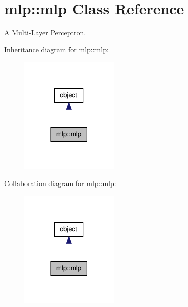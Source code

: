 \hypertarget{classmlp_1_1mlp}{
\section{mlp::mlp Class Reference}
\label{classmlp_1_1mlp}
}


A Multi-\/Layer Perceptron.  




Inheritance diagram for mlp::mlp:\nopagebreak
\begin{figure}[H]
\begin{center}
\leavevmode
\includegraphics[width=134pt]{classmlp_1_1mlp__inherit__graph}
\end{center}
\end{figure}


Collaboration diagram for mlp::mlp:\nopagebreak
\begin{figure}[H]
\begin{center}
\leavevmode
\includegraphics[width=134pt]{classmlp_1_1mlp__coll__graph}
\end{center}
\end{figure}
